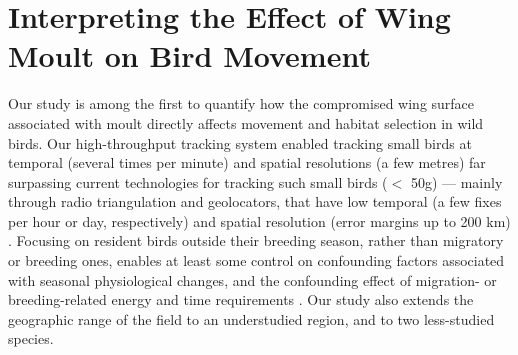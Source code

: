 
\section*{Interpreting the Effect of Wing Moult on Bird Movement}

Our study is among the first to quantify how the compromised wing surface associated with moult directly affects movement and habitat selection in wild birds.
Our high-throughput tracking system enabled tracking small birds at temporal (several times per minute) and spatial resolutions (a few metres) far surpassing current technologies for tracking such small birds ($<$ 50g) --- mainly through radio triangulation and geolocators, that have low temporal (a few fixes per hour or day, respectively) and spatial resolution (error margins up to 200 km) \citep{bridge2013}.
Focusing on resident birds outside their breeding season, rather than migratory or breeding ones, enables at least some control on confounding factors associated with seasonal physiological changes, and the confounding effect of migration- or breeding-related energy and time requirements \parencite{alerstam1990,wikelski2003,horvitz2014}.
Our study also extends the geographic range of the field to an understudied region, and to two less-studied species.

